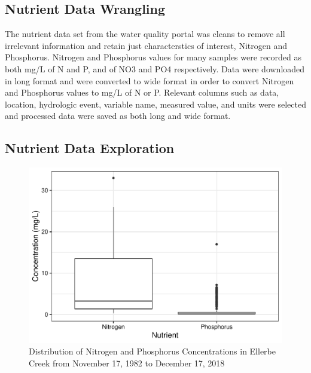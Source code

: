 \documentclass[12pt,]{article}
\begin{document}
\newpage

\hypertarget{nutrient-data-wrangling}{%
\subsection{Nutrient Data Wrangling}\label{nutrient-data-wrangling}}

The nutrient data set from the water quality portal was cleans to remove
all irrelevant information and retain just characterstics of interest,
Nitrogen and Phosphorus. Nitrogen and Phosphorus values for many samples
were recorded as both mg/L of N and P, and of NO3 and PO4 respectively.
Data were downloaded in long format and were converted to wide format in
order to convert Nitrogen and Phosphorus values to mg/L of N or P.
Relevant columns such as data, location, hydrologic event, variable
name, measured value, and units were selected and processed data were
saved as both long and wide format.

\hypertarget{nutrient-data-exploration}{%
\subsection{Nutrient Data Exploration}\label{nutrient-data-exploration}}

\begin{figure}
\centering
\includegraphics{Landman_ENV872_Project_files/figure-latex/Exploratory Analysis Figure 4-1.pdf}
\caption{Distribution of Nitrogen and Phosphorus Concentrations in
Ellerbe Creek from November 17, 1982 to December 17, 2018}
\end{figure}

\newpage
\end{document}
